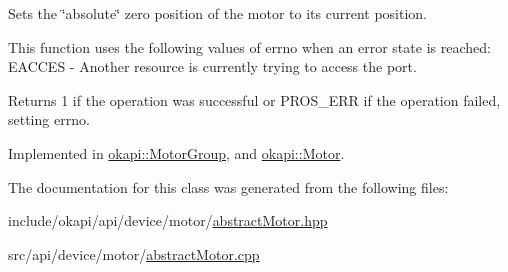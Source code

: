 Sets the \char`\"{}absolute\char`\"{} zero position of the motor to its current position.

This function uses the following values of errno when an error state is reached\+: E\+A\+C\+C\+ES -\/ Another resource is currently trying to access the port.

\begin{DoxyReturn}{Returns}
1 if the operation was successful or P\+R\+O\+S\+\_\+\+E\+RR if the operation failed, setting errno. 
\end{DoxyReturn}


Implemented in \mbox{\hyperlink{classokapi_1_1MotorGroup_a59aef8ea3c212e3466b67631978e47eb}{okapi\+::\+Motor\+Group}}, and \mbox{\hyperlink{classokapi_1_1Motor_aa71f3d93b734caec5c9245b211d4a0ad}{okapi\+::\+Motor}}.



The documentation for this class was generated from the following files\+:\begin{DoxyCompactItemize}
\item 
include/okapi/api/device/motor/\mbox{\hyperlink{abstractMotor_8hpp}{abstract\+Motor.\+hpp}}\item 
src/api/device/motor/\mbox{\hyperlink{abstractMotor_8cpp}{abstract\+Motor.\+cpp}}\end{DoxyCompactItemize}

